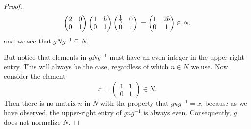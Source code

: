 \begin{enumerate}
\begin{proof}
\begin{equation*}
      \begin{pmatrix}
        2 & 0 \\
        0 & 1
      \end{pmatrix}
      \begin{pmatrix}
        1 & b \\
        0 & 1
      \end{pmatrix}
      \begin{pmatrix}
        \frac12 & 0 \\
        0 & 1
      \end{pmatrix} \\
      =
      \begin{pmatrix}
        1 & 2b \\
        0 & 1
      \end{pmatrix}\in N,
    \end{equation*}
    and we see that $gNg^{-1}\subseteq N$.

    But notice that elements in $gNg^{-1}$ must have an even integer
    in the upper-right entry. This will always be the case, regardless
    of which $n\in N$ we use. Now consider the element
    \begin{equation*}
      x =
      \begin{pmatrix}
        1 & 1 \\
        0 & 1
      \end{pmatrix}\in N.
    \end{equation*}
    Then there is no matrix $n$ in $N$ with the property that
    $gng^{-1} = x$, because as we have observed, the upper-right entry
    of $gng^{-1}$ is always even. Consequently, $g$ does not normalize
    $N$.
  \end{proof}
\end{enumerate}
